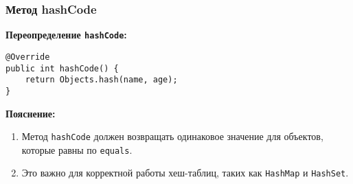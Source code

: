 \subsubsection{Метод hashCode}

\textbf{Переопределение \texttt{hashCode}:}
\begin{verbatim}
@Override
public int hashCode() {
    return Objects.hash(name, age);
}
\end{verbatim}

\textbf{Пояснение:}
\begin{enumerate}
    \item Метод \texttt{hashCode} должен возвращать одинаковое значение для объектов, которые равны по \texttt{equals}.
    \item Это важно для корректной работы хеш-таблиц, таких как \texttt{HashMap} и \texttt{HashSet}.
\end{enumerate}

